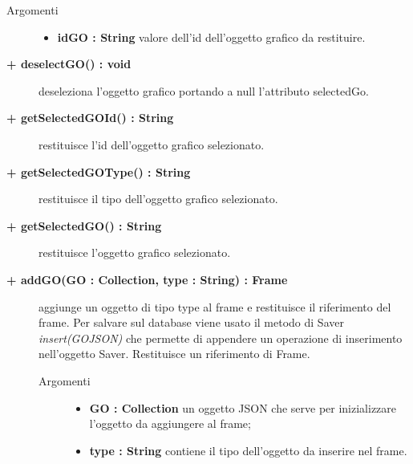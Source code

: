 \begin{description}
\begin{description}
\begin{description}
\begin{description}
			\item[Argomenti] \hfill
				\begin{itemize}
						\item \textbf{idGO : String			} \hfill
					valore dell'id dell'oggetto grafico da restituire.  				
				\end{itemize}

\end{description}

\end{description}

\begin{description}
		\item[\textbf{\color{blue}+ deselectGO() : void			}] \hfill
			deseleziona l'oggetto grafico portando a null l'attributo selectedGo. 
\end{description}

\begin{description}
		\item[\textbf{\color{blue}+ getSelectedGOId() : String			}] \hfill
			restituisce l'id dell'oggetto grafico selezionato.
\end{description}

\begin{description}
		\item[\textbf{\color{blue}+ getSelectedGOType() : String			}] \hfill
			restituisce il tipo dell'oggetto grafico selezionato.
\end{description}

\begin{description}
		\item[\textbf{\color{blue}+ getSelectedGO() : String			}] \hfill
			restituisce l'oggetto grafico selezionato.
\end{description}

\begin{description}
		\item[\textbf{\color{blue}+ addGO(GO : Collection, type : String) : Frame			}] \hfill
			aggiunge un oggetto di tipo type al frame e restituisce il riferimento del frame. Per  salvare sul database viene usato il metodo di Saver \textit{insert(GOJSON)} che permette di appendere un operazione di inserimento nell'oggetto Saver. Restituisce un riferimento di Frame.  

\begin{description}
			\item[Argomenti] \hfill
				\begin{itemize}
						\item \textbf{GO : Collection			} \hfill
					un oggetto JSON che serve per inizializzare l'oggetto da aggiungere al frame;
					  	\item \textbf{type : String			} \hfill
					  	contiene il tipo dell'oggetto da inserire nel frame.
				\end{itemize}


\end{description}
\end{description}
\end{description}
\end{description}
